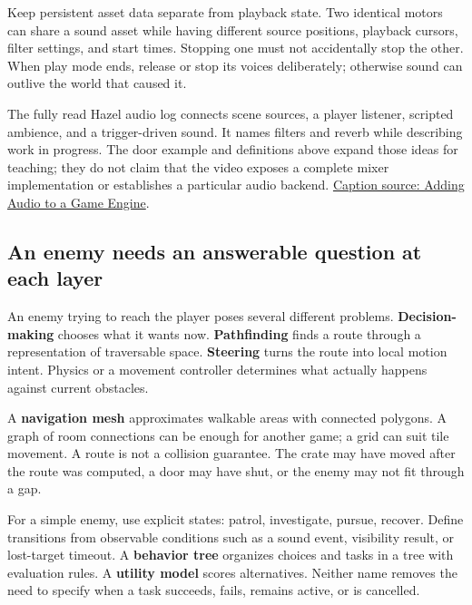 Keep persistent asset data separate from playback state. Two identical motors can share a sound asset while having different source positions, playback cursors, filter settings, and start times. Stopping one must not accidentally stop the other. When play mode ends, release or stop its voices deliberately; otherwise sound can outlive the world that caused it.

The fully read Hazel audio log connects scene sources, a player listener, scripted ambience, and a trigger-driven sound. It names filters and reverb while describing work in progress. The door example and definitions above expand those ideas for teaching; they do not claim that the video exposes a complete mixer implementation or establishes a particular audio backend. \href{https://www.youtube.com/watch?v=BmGHojuQMbk}{Caption source: Adding Audio to a Game Engine}.

\subsection{An enemy needs an answerable question at each layer}\label{06-engine-ii-ch040-an-enemy-needs-an-answerable-question-at-each-layer}

\hypertarget{06-engine-ii-ch040-an-enemy-needs-an-answerable-question-at-each-layer}{}

An enemy trying to reach the player poses several different problems. \textbf{Decision-making} chooses what it wants now. \textbf{Pathfinding} finds a route through a representation of traversable space. \textbf{Steering} turns the route into local motion intent. Physics or a movement controller determines what actually happens against current obstacles.

A \textbf{navigation mesh} approximates walkable areas with connected polygons. A graph of room connections can be enough for another game; a grid can suit tile movement. A route is not a collision guarantee. The crate may have moved after the route was computed, a door may have shut, or the enemy may not fit through a gap.

For a simple enemy, use explicit states: patrol, investigate, pursue, recover. Define transitions from observable conditions such as a sound event, visibility result, or lost-target timeout. A \textbf{behavior tree} organizes choices and tasks in a tree with evaluation rules. A \textbf{utility model} scores alternatives. Neither name removes the need to specify when a task succeeds, fails, remains active, or is cancelled.

